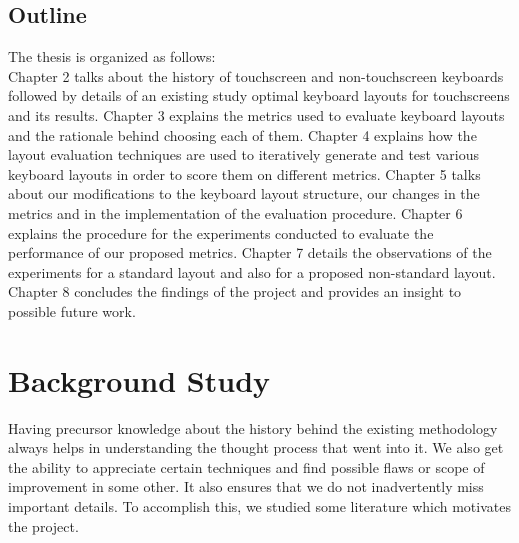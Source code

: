 \documentclass[MTech]{iitmdiss}
\begin{document}
\section{Outline}
The thesis is organized as follows:\\
Chapter 2 talks about the history of touchscreen and non-touchscreen keyboards followed by details of an existing study optimal keyboard layouts for touchscreens and its results. Chapter 3 explains the metrics used to evaluate keyboard layouts and the rationale behind choosing each of them.
Chapter 4 explains how the layout evaluation techniques are used to iteratively generate and test various keyboard layouts in order to score them on different metrics.
Chapter 5 talks about our modifications to the keyboard layout structure, our changes in the metrics and in the implementation of the evaluation procedure.
Chapter 6 explains the procedure for the experiments conducted to evaluate the performance of our proposed metrics.
Chapter 7 details the observations of the experiments for a standard layout and also for a proposed non-standard layout.
Chapter 8 concludes the findings of the project and provides an insight to possible future work.

\chapter{Background Study}
Having precursor knowledge about the history behind the existing methodology always helps in understanding the thought process that went into it. We also get the ability to appreciate certain techniques and find possible flaws or scope of improvement in some other. It also ensures that we do not inadvertently miss important details. To accomplish this, we studied some literature which motivates the project.
 
\end{document}
